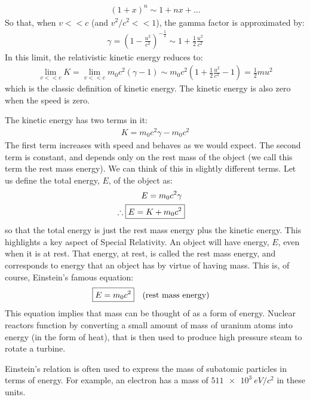 \begin{align*}
(1+x)^n\sim 1 + nx +\dots 
\end{align*}
So that, when $v<<c$ (and $v^2/c^2<<1$), the gamma factor is approximated by:
\begin{align*}
\gamma=\left(1-\frac{u^2}{c^2}\right)^{-\frac{1}{2}}\sim 1+\frac{1}{2}\frac{u^2}{c^2}
\end{align*}
In this limit, the relativistic kinetic energy reduces to:
\begin{align*}
\lim_{v<<c}K=\lim_{v<<c}m_0c^2(\gamma -1)\sim m_0c^2\left(1+\frac{1}{2}\frac{u^2}{c^2} - 1  \right)=\frac{1}{2}mu^2
\end{align*}
which is the classic definition of kinetic energy. The kinetic energy is also zero when the speed is zero.

The kinetic energy has two terms in it:
\begin{align*}
K=m_0c^2\gamma -m_0c^2
\end{align*}
The first term increases with speed and behaves as we would expect. The second term is constant, and depends only on the rest mass of the object (we call this term the rest mass energy). We can think of this in slightly different terms. Let us define the total energy, $E$, of the object as:
\begin{align*}
E=m_0c^2\gamma\\
\therefore \;\Aboxed{E = K+m_0c^2}
\end{align*}
so that the total energy is just the rest mass energy plus the kinetic energy. This highlights a key aspect of Special Relativity. An object will have energy, $E$, even when it is at rest. That energy, at rest, is called the rest mass energy, and corresponds to energy that an object has by virtue of having mass. This is, of course, Einstein's famous equation:
\begin{align*}
\Aboxed{E=m_0c^2}\quad \text{(rest mass energy)}
\end{align*}
This equation implies that mass can be thought of as a form of energy. Nuclear reactors function by converting a small amount of mass of uranium atoms into energy (in the form of heat), that is then used to produce high pressure steam to rotate a turbine.

Einstein's relation is often used to express the mass of subatomic particles in terms of energy. For example, an electron has a mass of $\SI{511e3}{eV/c^2}$ in these units. 

